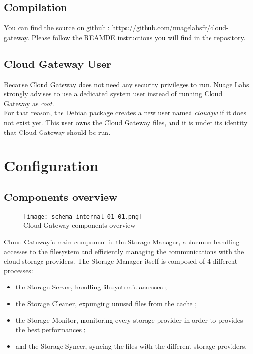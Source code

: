 \documentclass[11pt,fleqn,openany]{book} %
\begin{document}
\section{Compilation}
\label{sec:compilation}

You can find the source on github : https://github.com/nuagelabsfr/cloud-gateway. Please follow the REAMDE instructions you will find in the repository.

\section{Cloud Gateway User}
\label{sec:cloud-gateway-user}

Because Cloud Gateway does not need any security privileges to run, Nuage Labs strongly advises to use a dedicated
system user instead of running Cloud Gateway as \textit{root}.\\

For that reason, the Debian package creates a new user named \textit{cloudgw} if it does not exist yet.
This user owns the Cloud Gateway files, and it is under its identity that Cloud Gateway should be run.

\cleardoublepage %
\chapter{Configuration}
\label{chap:configuration}

\section{Components overview}
\label{sec:components-overview}

\begin{figure}[H]
\centering
\texttt{[image: schema-internal-01-01.png]}\\
Cloud Gateway components overview
\end{figure}

Cloud Gateway's main component is the Storage Manager, a daemon handling accesses to the filesystem
and efficiently managing the communications with the cloud storage providers. The Storage Manager itself is composed
of 4 different processes:\\
\begin{itemize}
\item the Storage Server, handling filesystem's accesses ;
\item the Storage Cleaner, expunging unused files from the cache ;
\item the Storage Monitor, monitoring every storage provider in order to provides the best performances ;
\item and the Storage Syncer, syncing the files with the different storage providers.\\
\end{itemize}
\end{document}
